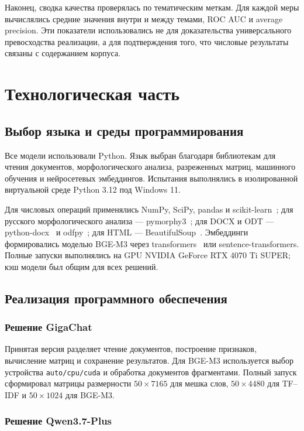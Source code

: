 \documentclass[a4paper,12pt]{extreport}
\newcommand{\code}[1]{\nolinkurl{#1}}
\begin{document}
Наконец, сводка качества проверялась по тематическим меткам. Для каждой меры вычислялись средние значения внутри и между темами, ROC AUC и average precision. Эти показатели использовались не для доказательства универсального превосходства реализации, а для подтверждения того, что числовые результаты связаны с содержанием корпуса.

\chapter{Технологическая часть}

\section{Выбор языка и среды программирования}

Все модели использовали Python. Язык выбран благодаря библиотекам для чтения документов, морфологического анализа, разреженных матриц, машинного обучения и нейросетевых эмбеддингов. Испытания выполнялись в изолированной виртуальной среде Python 3.12 под Windows 11.

Для числовых операций применялись NumPy, SciPy, pandas и scikit-learn~\cite{sklearn}; для русского морфологического анализа --- pymorphy3~\cite{pymorphy3}; для DOCX и ODT --- python-docx~\cite{docx} и odfpy~\cite{odfpy}; для HTML --- BeautifulSoup~\cite{bs4}. Эмбеддинги формировались моделью BGE-M3 через transformers~\cite{transformers} или sentence-transformers. Полные запуски выполнялись на GPU NVIDIA GeForce RTX 4070 Ti SUPER; кэш модели был общим для всех решений.

\section{Реализация программного обеспечения}

\subsection{Решение GigaChat}

Принятая версия разделяет чтение документов, построение признаков, вычисление матриц и сохранение результатов. Для BGE-M3 используется выбор устройства \code{auto/cpu/cuda} и обработка документов фрагментами. Полный запуск сформировал матрицы размерности $50\times7165$ для мешка слов, $50\times4480$ для TF--IDF и $50\times1024$ для BGE-M3.

\subsection{Решение Qwen3.7-Plus}
\end{document}

